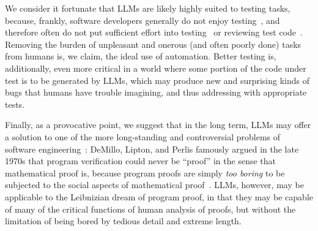 \documentclass[sigconf,natbib=false]{acmart}
\begin{document}
We consider it fortunate that LLMs are likely highly suited to testing
tasks, because, frankly, software developers generally do not enjoy
testing~\cite{DevsHateTesting}, and therefore often do not put sufficient effort into
testing~\cite{DevsDontTestEnough} or reviewing test code~\cite{TestCodeReview}.  Removing the burden of unpleasant and onerous (and often
poorly done) tasks from humans is, we claim, the ideal use of
automation.  Better testing is, additionally, even more critical in a
world where some portion of the code under test is to be generated by
LLMs, which may produce new and surprising kinds of bugs that humans
have trouble imagining, and thus addressing with appropriate tests.

Finally, as a provocative point, we suggest that in the long term,
LLMs may offer a solution to one of the more long-standing and
controversial problems of software engineering~\cite{mackenzie2004mechanizing}:
DeMillo, Lipton, and Perlis famously argued in the late 1970s that
program verification could never be ``proof'' in the sense that
mathematical proof is, because program proofs are simply \emph{too boring} to
be subjected to the social aspects of mathematical
proof~\cite{de1979social}.  LLMs, however, may be applicable to the Leibnizian
dream of program proof, in that they may be capable of many of the
critical functions of human analysis of proofs, but without the limitation of being
bored by tedious detail and extreme length.




\end{document}
